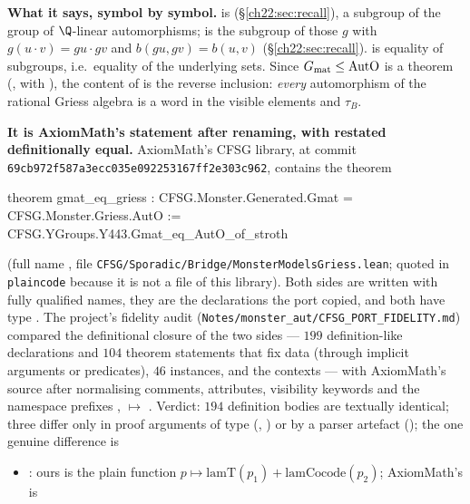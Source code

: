 \begin{dictionary}
\textbf{What it says, symbol by symbol.}   is
 (\S\ref{ch22:sec:recall}), a subgroup of the group
 of $\Q$-linear automorphisms;  is the subgroup of those $g$ with
$g(u\cdot v)=gu\cdot gv$ and $b(gu,gv)=b(u,v)$ (\S\ref{ch22:sec:recall}).  \lean{=} is equality of subgroups, i.e.\ equality of
the underlying sets.  Since $G_{\mathrm{mat}}\le\mathrm{AutO}$ is a theorem (, with
), the content of  is the reverse inclusion: \emph{every} automorphism of the rational
Griess algebra is a word in the visible elements and $\tau_B$.

\textbf{It is AxiomMath's statement after renaming, with  restated definitionally equal.}  AxiomMath's CFSG
library, at commit \texttt{69cb972f587a3ecc035e092253167ff2e303c962}, contains the theorem
\begin{plaincode}
theorem gmat_eq_griess :
    CFSG.Monster.Generated.Gmat = CFSG.Monster.Griess.AutO :=
  CFSG.YGroups.Y443.Gmat_eq_AutO_of_stroth
\end{plaincode}
(full name , file
\texttt{CFSG/Sporadic/Bridge/MonsterModelsGriess.lean}; quoted in \texttt{plaincode} because it is not a file of this
library).  Both sides are written with fully qualified names, they are the declarations the port copied, and both have type
.  The project's fidelity audit (\texttt{Notes/monster\_aut/CFSG\_PORT\_FIDELITY.md})
compared the definitional closure of the two sides --- $199$ definition-like declarations and $104$ theorem
statements that fix data (through implicit arguments or  predicates), $46$ instances, and the
 contexts --- with AxiomMath's source after normalising comments, attributes, visibility keywords and the
namespace prefixes ,  $\mapsto$ .  Verdict:
$194$ definition bodies are textually identical; three differ only in proof arguments of  type (,
) or by a parser artefact (); the one genuine difference is
\begin{itemize}
\item {}: ours is the plain function $p\mapsto\mathrm{lamT}(p_1)+\mathrm{lamCocode}(p_2)$; AxiomMath's is

\end{itemize}
\end{dictionary}
